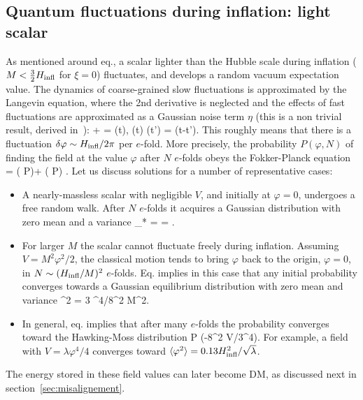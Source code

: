 \subsection{Quantum fluctuations during inflation: light scalar}
\label{sec:scalardS}
As mentioned around eq., a scalar lighter than the Hubble scale during inflation
($M < \frac{3}{2}H_{\rm infl}$ for $\xi=0$) fluctuates, and develops
a random vacuum expectation value.
The dynamics of coarse-grained slow fluctuations 
is approximated by the Langevin equation, 
where the 2nd derivative is neglected and the effects of fast fluctuations are approximated as
a Gaussian noise term $\eta$ (this is a non trivial result, derived in~\cite{astro-ph/9407016}):
\be
{} +   = \eta(t),\qquad
\langle \eta(t) \eta(t') \rangle =  \delta(t-t').
\label{eq:Langevin}
\ee
This roughly means that there is a fluctuation $\delta \varphi \sim H_{\rm infl}/2\pi $ per $e$-fold.
More precisely, the probability $P(\varphi,N)$ of finding the field at the value $\varphi$ after $N$ $e$-folds obeys the Fokker-Planck equation
\beq
   =  \bigg(    P\bigg)+
 \frac{\partial }{\partial \varphi}  \bigg( P\bigg) .
 \label{eq:Fokker}
 \eeq
Let us discuss solutions for a number of representative cases:
\begin{itemize}
\item[1)] A nearly-massless scalar with negligible $V$, and initially at $\varphi=0$, undergoes a free random walk.
After  $N$ $e$-folds it acquires a Gaussian distribution with zero mean and a variance
\beq 
\label{eq:varphi*:random}
\varphi_* = \sqrt{\langle \varphi^2 \rangle} = \frac{\HI}{2\pi}.
\eeq

\item[2)] For larger $M$ the scalar  cannot fluctuate freely during inflation.
Assuming $V=M^2 \varphi^2/2$, the classical motion tends to bring $\varphi$ back to the origin, $\varphi=0$,
in $N\sim (H_{\rm infl}/M)^2$
$e$-folds. Eq. implies in this case that  any initial probability converges towards a Gaussian equilibrium distribution with
zero mean and variance
\beq \label{eq:massivescalardS}
\langle \varphi^2 \rangle = 3 \HI^4/8\pi^2 M^2.\eeq

\item[3)] In general, eq. implies that after many $e$-folds the probability converges toward  the Hawking-Moss distribution
\beq P \propto \exp(-8\pi^2 V/3\HI^4).\eeq
For example, a field with $V = \lambda \varphi^4/4$ converges toward
$  \langle \varphi^2 \rangle=0.13 H_{\rm infl}^2/\sqrt{\lambda}$.
\end{itemize}
The energy stored in these field values can later become DM, as discussed next in section~\ref{sec:misalignement}.

